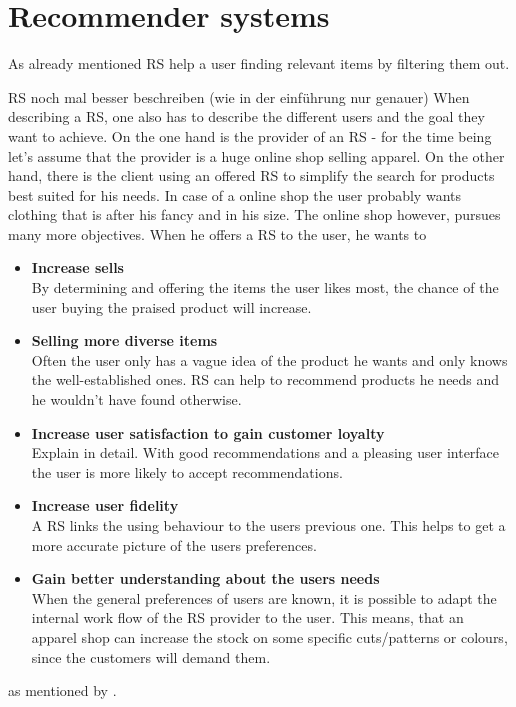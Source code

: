 

\section{Recommender systems}
As already mentioned RS help a user finding relevant items by filtering them out.

{\color{red}RS noch mal besser beschreiben (wie in der einf\"uhrung nur genauer)}
When describing a RS, one also has to describe the different users and the goal they want to achieve.
On the one hand is the provider of an RS - for the time being let's assume that the provider is a huge online shop selling apparel.
On the other hand, there is the client using an offered RS to simplify the search for products best suited for his needs.
In case of a online shop the user probably wants clothing that is after his fancy and in his size.
The online shop however, pursues many more objectives.
When he offers a RS to the user, he wants to
\begin{itemize}
    \item\textbf{Increase sells}\hfill\\
        By determining and offering the items the user likes most, the chance of the user buying the praised product will increase.
    \item\textbf{Selling more diverse items}\hfill\\
        Often the user only has a vague idea of the product he wants and only knows the well-established ones.
        RS can help to recommend products he needs and he wouldn't have found otherwise.
    \item\textbf{Increase user satisfaction to gain customer loyalty}\hfill\\
        {\color{red} Explain in detail.}
        With good recommendations and a pleasing user interface the user is more likely to accept recommendations.
    \item\textbf{Increase user fidelity}\hfill\\
        A RS links the using behaviour to the users previous one.
        This helps to get a more accurate picture of the users preferences.
    \item\textbf{Gain better understanding about the users needs}\hfill\\
        When the general preferences of users are known, it is possible to adapt the internal work flow of the RS provider to the user.
        This means, that an apparel shop can increase the stock on some specific cuts/patterns or colours, since the customers will demand them.
\end{itemize}
as mentioned by \citeauthor{ricci:2011}.\citep[p.~4-5]{ricci:2011}
\\

